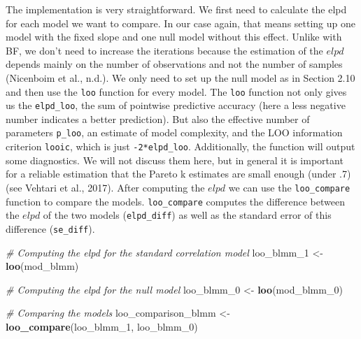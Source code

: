 \documentclass[
  doc,12pt,floatsintext]{apa7}
\newenvironment{Shaded}{\begin{snugshade}}{\end{snugshade}}
\newcommand{\CommentTok}[1]{\textcolor[rgb]{0.56,0.35,0.01}{\textit{#1}}}
\newcommand{\FunctionTok}[1]{\textcolor[rgb]{0.13,0.29,0.53}{\textbf{#1}}}
\newcommand{\NormalTok}[1]{#1}
\newcommand{\OtherTok}[1]{\textcolor[rgb]{0.56,0.35,0.01}{#1}}
\begin{document}
The implementation is very straightforward. We first need to calculate the elpd for each model we want to compare. In our case again, that means setting up one model with the fixed slope and one null model without this effect. Unlike with BF, we don't need to increase the iterations because the estimation of the \(elpd\) depends mainly on the number of observations and not the number of samples (Nicenboim et al., n.d.). We only need to set up the null model as in Section 2.10 and then use the \texttt{loo} function for every model. The \texttt{loo} function not only gives us the \texttt{elpd\_loo}, the sum of pointwise predictive accuracy (here a less negative number indicates a better prediction). But also the effective number of parameters \texttt{p\_loo}, an estimate of model complexity, and the LOO information criterion \texttt{looic}, which is just \texttt{-2*elpd\_loo}. Additionally, the function will output some diagnostics. We will not discuss them here, but in general it is important for a reliable estimation that the Pareto k estimates are small enough (under .7) (see Vehtari et al., 2017). After computing the \(elpd\) we can use the \texttt{loo\_compare} function to compare the models. \texttt{loo\_compare} computes the difference between the \(elpd\) of the two models (\texttt{elpd\_diff}) as well as the standard error of this difference (\texttt{se\_diff}).

\begin{Shaded}
\begin{Highlighting}[]
\CommentTok{\# Computing the elpd for the standard correlation model}
\NormalTok{loo\_blmm\_1 }\OtherTok{\textless{}{-}} \FunctionTok{loo}\NormalTok{(mod\_blmm)}

\CommentTok{\# Computing the elpd for the null model}
\NormalTok{loo\_blmm\_0 }\OtherTok{\textless{}{-}} \FunctionTok{loo}\NormalTok{(mod\_blmm\_0)}

\CommentTok{\# Comparing the models}
\NormalTok{loo\_comparison\_blmm }\OtherTok{\textless{}{-}} \FunctionTok{loo\_compare}\NormalTok{(loo\_blmm\_1, loo\_blmm\_0)}
\end{Highlighting}
\end{Shaded}
\end{document}
